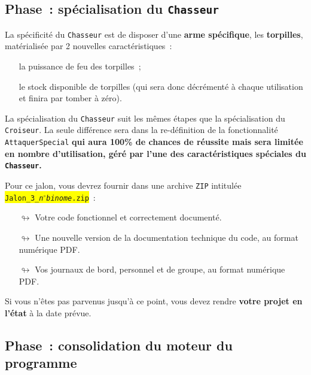 \documentclass[10pt, fleqn, a4paper]{article}
\newcommand{\bfcolor}[2]{\textcolor{#1}{\textbf{#2}}}
\newcommand\myframecolor{}
\newcommand\mybgcolor{}
\newenvironment{mycolorbox}[2]
{
\def\myframecolor{#1}
\def\mybgcolor{#2}
\begingroup
\begin{lrbox}{\mytextbox}
\begin{minipage}[t]{\textwidth}
}
{
\end{minipage}\end{lrbox}
\fcolorbox{\myframecolor}{\mybgcolor}{\usebox{\mytextbox}}
\endgroup
}
\newcounter{quest}
\begin{document}
\addtocounter{quest}{1}
\subsection*{Phase~\thequest : spécialisation du \texttt{Chasseur}}
\label{phase_escadron}

La spécificité du \texttt{Chasseur} est de disposer d'une \bfcolor{blueTD}{arme spécifique}, les \bfcolor{blueTD}{torpilles}, matérialisée par 2 nouvelles caractéristiques~:
\begin{itemize}
\item[\ding{223}] la puissance de feu des torpilles~;
\item[\ding{223}] le \og{}stock\fg{} disponible de torpilles (qui sera donc décrémenté à chaque utilisation et finira par tomber à zéro).
\end{itemize}

La spécialisation du \texttt{Chasseur} suit les mêmes étapes que la spécialisation du \texttt{Croiseur}. La seule différence sera dans la re-définition de la fonctionnalité \texttt{AttaquerSpecial} \bfcolor{greenTP}{qui aura 100\% de chances de réussite mais sera limitée en nombre d'utilisation, géré par l'une des caractéristiques spéciales du \texttt{Chasseur}.}

\vspace{5mm}
\begin{mycolorbox}{black}{orange}
Pour ce jalon, vous devrez fournir dans une archive \texttt{ZIP} intitulée\\ \colorbox{yellow}{\texttt{Jalon\_3\_\textit{n$^\circ$binome}.zip}}~:
\begin{itemize}
\item[$\looparrowright$] Votre code fonctionnel et correctement documenté.
\item[$\looparrowright$] Une nouvelle version de la documentation technique du code, au format numérique PDF.
\item[$\looparrowright$] Vos journaux de bord, personnel et de groupe, au format numérique PDF.
\end{itemize}
\begin{mycolorbox}{black}{yellow}Si vous n'êtes pas parvenus jusqu'à ce point, vous devez rendre \textbf{votre projet en l'état} à la date prévue.\end{mycolorbox}
\end{mycolorbox}

\addtocounter{quest}{1}
\subsection*{Phase~\thequest : consolidation du moteur du programme}
\label{phase_surcharge}
\end{document}

